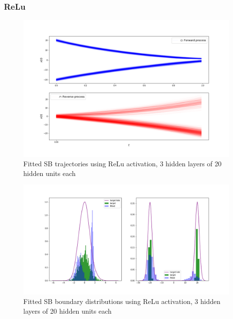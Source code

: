 \documentclass[a4paper,12pt,twoside,openright]{report}
\theoremstyle{definition}
\begin{document}
\subsubsection{ReLu}
\begin{figure}
    \centering
    \includegraphics[scale=0.4,trim={2.3cm 1cm 2.5cm 0}, clip]{images/Control/bimod_final_relu_trajectories.png}
    \caption{ Fitted SB  trajectories using ReLu activation, 3 hidden layers of 20 hidden units each}
    \label{fig:trajectoriesbimodrelunn}
\end{figure}
\begin{figure}
    \centering
    \includegraphics[scale=0.4,trim={2.3cm 1cm 2.5cm 0}, clip]{images/Control/bimod_final_relu_boundaires.png}
    \caption{ Fitted SB  boundary distributions using ReLu activation, 3 hidden layers of 20 hidden units each}
    \label{fig:boundsbimodrelunn}
\end{figure}
\end{document}

